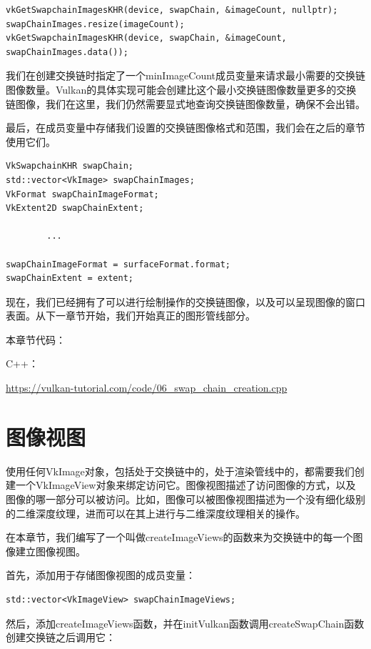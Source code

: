 \documentclass{ctexart}
\begin{document}
\begin{lstlisting}[language={[ANSI]C}]
vkGetSwapchainImagesKHR(device, swapChain, &imageCount, nullptr);
swapChainImages.resize(imageCount);
vkGetSwapchainImagesKHR(device, swapChain, &imageCount, swapChainImages.data());
\end{lstlisting}

我们在创建交换链时指定了一个minImageCount成员变量来请求最小需要的交换链图像数量。Vulkan的具体实现可能会创建比这个最小交换链图像数量更多的交换链图像，我们在这里，我们仍然需要显式地查询交换链图像数量，确保不会出错。

最后，在成员变量中存储我们设置的交换链图像格式和范围，我们会在之后的章节使用它们。

\begin{lstlisting}[language={[ANSI]C}]
VkSwapchainKHR swapChain;
std::vector<VkImage> swapChainImages;
VkFormat swapChainImageFormat;
VkExtent2D swapChainExtent;

		...

swapChainImageFormat = surfaceFormat.format;
swapChainExtent = extent;
\end{lstlisting}

现在，我们已经拥有了可以进行绘制操作的交换链图像，以及可以呈现图像的窗口表面。从下一章节开始，我们开始真正的图形管线部分。

本章节代码：

C++：

\url{https://vulkan-tutorial.com/code/06_swap_chain_creation.cpp}

\newpage
\section{图像视图}

使用任何VkImage对象，包括处于交换链中的，处于渲染管线中的，都需要我们创建一个VkImageView对象来绑定访问它。图像视图描述了访问图像的方式，以及图像的哪一部分可以被访问。比如，图像可以被图像视图描述为一个没有细化级别的二维深度纹理，进而可以在其上进行与二维深度纹理相关的操作。

在本章节，我们编写了一个叫做createImageViews的函数来为交换链中的每一个图像建立图像视图。

首先，添加用于存储图像视图的成员变量：

\begin{lstlisting}[language={[ANSI]C}]
std::vector<VkImageView> swapChainImageViews;
\end{lstlisting}

然后，添加createImageViews函数，并在initVulkan函数调用createSwapChain函数创建交换链之后调用它：
\end{document}
